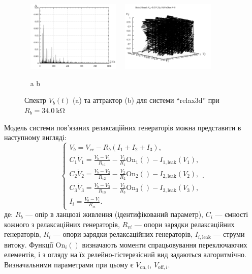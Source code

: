 \documentclass[a4paper,13pt]{atuaref}
\begin{document}
\begin{figure}[htb!]
  \centerline{
    ~ \hfill
    \includegraphics[width=0.40\textwidth]{p7/p/relax3d_f_08_xl.png}
    ~
    \includegraphics[width=0.40\textwidth]{p7/p/relax3d_v1v2v3_08.png}
    \hfill ~
  }
  \vspace{-1.5ex}
  \begin{center}
    ~ \hfill a \hfill\hfill b \hfill ~
  \end{center}
  \vspace{-2.5ex}
  \caption{Спектр $V_b(t)$ (a) та аттрактор (b) для системи ``relax3d'' при $R_b=\SI{34.0}{\kilo\ohm}$ }
  \label{atu:f:relax3d_f_08}
\end{figure}

Модель системи пов'язаних релаксаційних генераторів можна представити в наступному вигляді:
%
\begin{equation}
  \begin{cases}
    V_b = V_{cc} - R_b ( I_1 + I_2 + I_3 ), \\
      C_1 \dot{V}_1 = \frac{V_b-V_1}{R_{v1}} - \frac{V_1}{R_1} \mathrm{On}_1() - I_{1,\mathrm{leak}}(V_1), \\
      C_2 \dot{V}_2 = \frac{V_b-V_2}{R_{v2}} - \frac{V_2}{R_2} \mathrm{On}_2() - I_{2,\mathrm{leak}}(V_2), \\
      C_3 \dot{V}_3 = \frac{V_b-V_3}{R_{v3}} - \frac{V_3}{R_3} \mathrm{On}_3() - I_{3,\mathrm{leak}}(V_3), \\
      I_i = \frac{V_b-V_i}{R_{vi}}.
  \end{cases}.
    \label{atu:eq:relax3}
\end{equation}
%
де:
$R_b$ --- опір в ланцюзі живлення (ідентифікований параметр),
$C_i$ --- ємності кожного з релаксаційних генераторів,
$R_{vi}$ --- опори зарядки релаксаційних генераторів,
$R_{i}$ --- опори зарядки релаксаційних генераторів,
$I_{i,\mathrm{leak}}$ --- струми витоку.
Функції $\mathrm{On}_i()$ визначають моменти спрацьовування переключаючих
елементів, і з огляду на їх релейно-гістерезісний вид задаються алгоритмічно.
Визначальними параметрами при цьому є
$V_{\mathrm{on},i}$, $V_{\mathrm{off},i}$.
\end{document}
